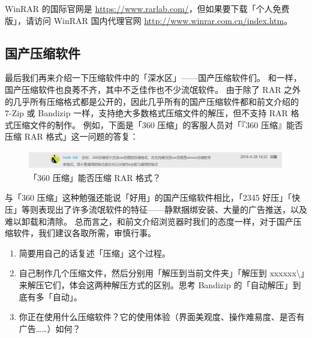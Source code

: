 WinRAR 的国际官网是 \url{https://www.rarlab.com/}，但如果要下载「个人免费版」，请访问 WinRAR 国内代理官网 \url{http://www.winrar.com.cn/index.htm}。

\subsection{国产压缩软件}

最后我们再来介绍一下压缩软件中的「深水区」——国产压缩软件们。
和一样，国产压缩软件也良莠不齐，其中不乏佳作也不少流氓软件。
由于除了 RAR 之外的几乎所有压缩格式都是公开的，因此几乎所有的国产压缩软件都和前文介绍的 7-Zip 或 Bandizip 一样，支持绝大多数格式压缩文件的解压，但不支持 RAR 格式压缩文件的制作。
例如，下面是「360 压缩」的客服人员对「『360 压缩』能否压缩 RAR 格式」这一问题的答复：

\begin{figure}[htb!]
  \centering
  \includegraphics[width=12cm]{assets/360_Zip.png}
  \caption{「360 压缩」能否压缩 RAR 格式？}
  \label{360_Zip}
\end{figure}

与「360 压缩」这种勉强还能说「好用」的国产压缩软件相比，「2345 好压」「快压」等则表现出了许多流氓软件的特征——静默捆绑安装、大量的广告推送，以及难以卸载和清除。
总而言之，和前文介绍浏览器时我们的态度一样，对于国产压缩软件，我们建议各取所需，审慎行事。

\practice

\begin{enumerate}
  \item 简要用自己的话复述「压缩」这个过程。
  \item 自己制作几个压缩文件，然后分别用「解压到当前文件夹」「解压到 xxxxxx\textbackslash 」来解压它们，体会这两种解压方式的区别。思考 Bandizip 的「自动解压」到底有多「自动」。
  \item 你正在使用什么压缩软件？它的使用体验（界面美观度、操作难易度、是否有广告……）如何？
\end{enumerate}